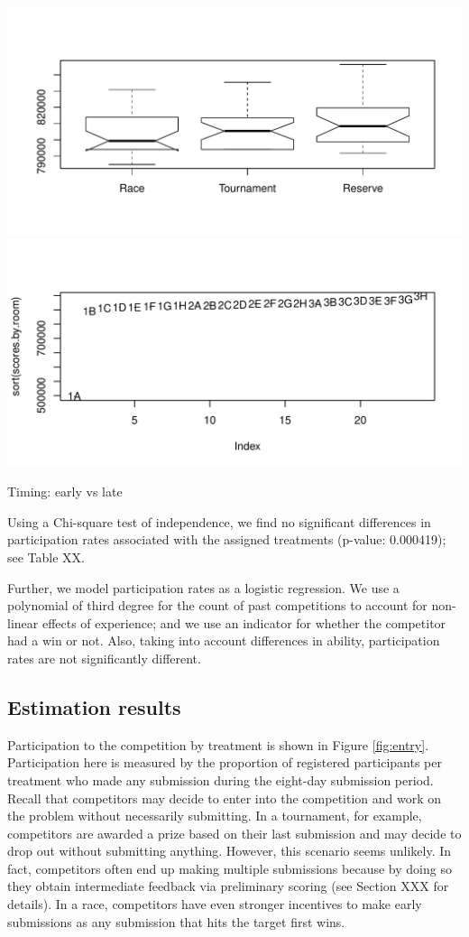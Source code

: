 \documentclass[12pt,]{article}
\begin{document}
\includegraphics{Figures/unnamed-chunk-13-1.pdf}
\includegraphics{Figures/unnamed-chunk-13-2.pdf}

Timing: early vs late

Using a Chi-square test of independence, we find no significant
differences in participation rates associated with the assigned
treatments (p-value: 0.000419); see Table XX.

Further, we model participation rates as a logistic regression. We use a
polynomial of third degree for the count of past competitions to account
for non-linear effects of experience; and we use an indicator for
whether the competitor had a win or not. Also, taking into account
differences in ability, participation rates are not significantly
different.

\subsection{Estimation results}\label{estimation-results}

Participation to the competition by treatment is shown in Figure
\ref{fig:entry}. Participation here is measured by the proportion of
registered participants per treatment who made any submission during the
eight-day submission period. Recall that competitors may decide to enter
into the competition and work on the problem without necessarily
submitting. In a tournament, for example, competitors are awarded a
prize based on their last submission and may decide to drop out without
submitting anything. However, this scenario seems unlikely. In fact,
competitors often end up making multiple submissions because by doing so
they obtain intermediate feedback via preliminary scoring (see Section
XXX for details). In a race, competitors have even stronger incentives
to make early submissions as any submission that hits the target first
wins.
\end{document}
